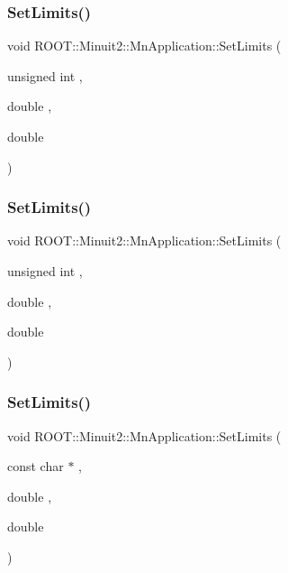 \subsubsection{\texorpdfstring{SetLimits()}{SetLimits()}\hspace{0.1cm}{\footnotesize\ttfamily [2/6]}}
{\footnotesize\ttfamily void R\+O\+O\+T\+::\+Minuit2\+::\+Mn\+Application\+::\+Set\+Limits (\begin{DoxyParamCaption}\item[{unsigned int}]{,  }\item[{double}]{,  }\item[{double}]{ }\end{DoxyParamCaption})}

\mbox{\label{classROOT_1_1Minuit2_1_1MnApplication_ad6c07174e01b117cb67a43211753ae06}} 
\subsubsection{\texorpdfstring{SetLimits()}{SetLimits()}\hspace{0.1cm}{\footnotesize\ttfamily [3/6]}}
{\footnotesize\ttfamily void R\+O\+O\+T\+::\+Minuit2\+::\+Mn\+Application\+::\+Set\+Limits (\begin{DoxyParamCaption}\item[{unsigned int}]{,  }\item[{double}]{,  }\item[{double}]{ }\end{DoxyParamCaption})}

\mbox{\label{classROOT_1_1Minuit2_1_1MnApplication_a7c5404de0cf4efac550bea31f3cd4088}} 
\subsubsection{\texorpdfstring{SetLimits()}{SetLimits()}\hspace{0.1cm}{\footnotesize\ttfamily [4/6]}}
{\footnotesize\ttfamily void R\+O\+O\+T\+::\+Minuit2\+::\+Mn\+Application\+::\+Set\+Limits (\begin{DoxyParamCaption}\item[{const char $\ast$}]{,  }\item[{double}]{,  }\item[{double}]{ }\end{DoxyParamCaption})}

